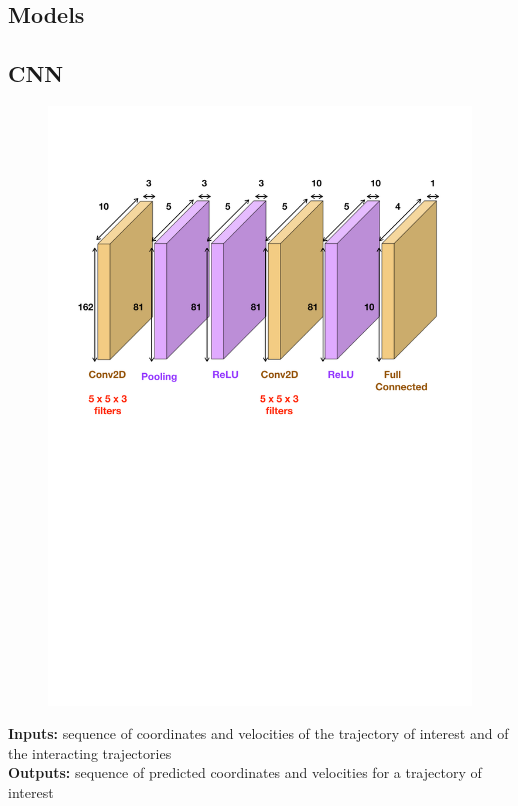 \documentclass[a0,portrait]{a0poster}
\begin{document}
\begin{multicols}{2}

\section*{Models}

\subsection{CNN}

\begin{figure}
\includegraphics[scale = 0.35]{figure/CNN}
\end{figure}
\textbf{Inputs:}  sequence of coordinates and velocities of the trajectory of interest and of the interacting trajectories\\
\textbf{Outputs:} sequence of predicted coordinates and velocities for a trajectory of interest 


\end{multicols}
\end{document}
